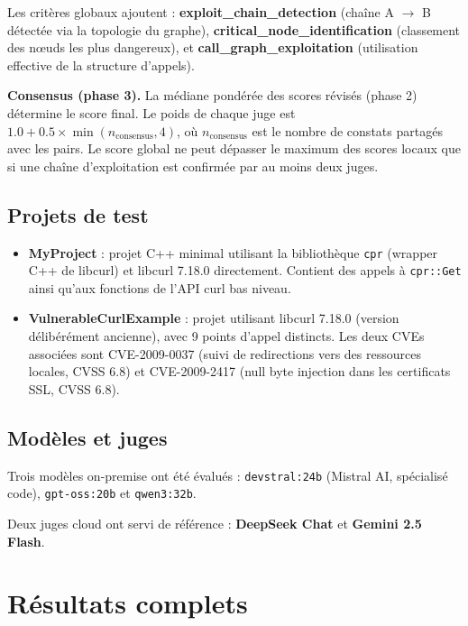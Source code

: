 \documentclass[a4paper, 12pt, hidelinks]{article}
\begin{document}
Les critères globaux ajoutent : \textbf{exploit\_chain\_detection} (chaîne A $\rightarrow$ B détectée via la topologie du graphe), \textbf{critical\_node\_identification} (classement des nœuds les plus dangereux), et \textbf{call\_graph\_exploitation} (utilisation effective de la structure d'appels).

\textbf{Consensus (phase 3).} La médiane pondérée des scores révisés (phase 2) détermine le score final. Le poids de chaque juge est $1.0 + 0.5 \times \min(n_{\text{consensus}}, 4)$, où $n_{\text{consensus}}$ est le nombre de constats partagés avec les pairs. Le score global ne peut dépasser le maximum des scores locaux que si une chaîne d'exploitation est confirmée par au moins deux juges.

\subsection*{Projets de test}

\begin{itemize}
  \item \textbf{MyProject} : projet C++ minimal utilisant la bibliothèque \texttt{cpr} (wrapper C++ de libcurl) et libcurl 7.18.0 directement. Contient des appels à \texttt{cpr::Get} ainsi qu'aux fonctions de l'API curl bas niveau.
  \item \textbf{VulnerableCurlExample} : projet utilisant libcurl 7.18.0 (version délibérément ancienne), avec 9 points d'appel distincts. Les deux CVEs associées sont CVE-2009-0037 (suivi de redirections vers des ressources locales, CVSS 6.8) et CVE-2009-2417 (null byte injection dans les certificats SSL, CVSS 6.8).
\end{itemize}

\subsection*{Modèles et juges}

Trois modèles on-premise ont été évalués :
\texttt{devstral:24b} (Mistral AI, spécialisé code), \texttt{gpt-oss:20b} et \texttt{qwen3:32b}.

Deux juges cloud ont servi de référence : \textbf{DeepSeek Chat} et \textbf{Gemini 2.5 Flash}.

\section{Résultats complets}
\end{document}
